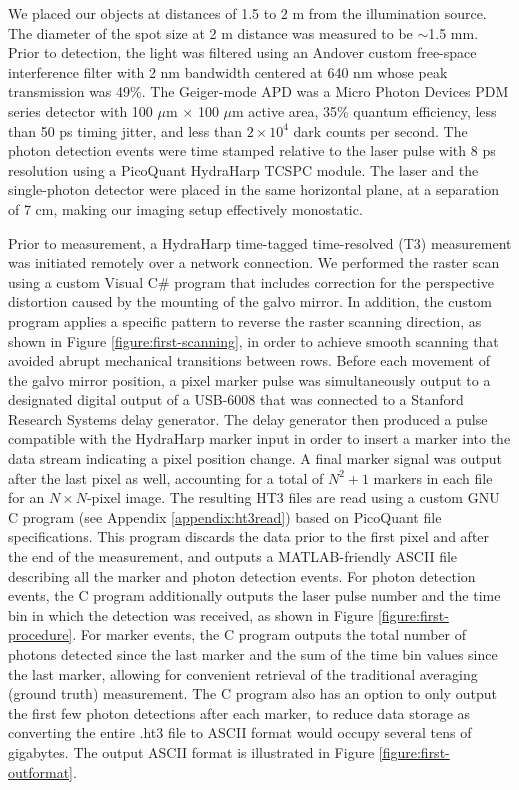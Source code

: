 We placed our objects at distances of 1.5 to 2 m from the illumination source. The diameter of the spot size at 2 m distance was measured to be $\sim$1.5 mm. Prior to detection, the light was filtered using an Andover custom free-space interference filter with 2 nm bandwidth centered at 640 nm whose peak transmission was 49\%. The Geiger-mode APD was a Micro Photon Devices PDM series detector with 100 $\mu$m $\times$ 100 $\mu$m active area, 35\% quantum efficiency, less than 50 ps timing jitter, and less than $2\times 10^4$ dark counts per second. The photon detection events were time stamped relative to the laser pulse with 8 ps resolution using a PicoQuant HydraHarp TCSPC module. The laser and the single-photon detector were placed in the same horizontal plane, at a separation of 7 cm, making our imaging setup effectively monostatic.

Prior to measurement, a HydraHarp time-tagged time-resolved (T3) measurement was initiated remotely over a network connection. We performed the raster scan using a custom Visual C\# program that includes correction for the perspective distortion caused by the mounting of the galvo mirror. In addition, the custom program applies a specific pattern to reverse the raster scanning direction, as shown in Figure \ref{figure:first-scanning}, in order to achieve smooth scanning that avoided abrupt mechanical transitions between rows. Before each movement of the galvo mirror position, a pixel marker pulse was simultaneously output to a designated digital output of a USB-6008 that was connected to a Stanford Research Systems delay generator. The delay generator then produced a pulse compatible with the HydraHarp marker input in order to insert a marker into the data stream indicating a pixel position change. A final marker signal was output after the last pixel as well, accounting for a total of $N^2+1$ markers in each file for an $N \times N$-pixel image. The resulting HT3 files are read using a custom GNU C program (see Appendix \ref{appendix:ht3read}) based on PicoQuant file specifications. This program discards the data prior to the first pixel and after the end of the measurement, and outputs a MATLAB-friendly ASCII file describing all the marker and photon detection events. For photon detection events, the C program additionally outputs the laser pulse number and the time bin in which the detection was received, as shown in Figure \ref{figure:first-procedure}. For marker events, the C program outputs the total number of photons detected since the last marker and the sum of the time bin values since the last marker, allowing for convenient retrieval of the traditional averaging (ground truth) measurement. The C program also has an option to only output the first few photon detections after each marker, to reduce data storage as converting the entire .ht3 file to ASCII format would occupy several tens of gigabytes. The output ASCII format is illustrated in Figure \ref{figure:first-outformat}.

